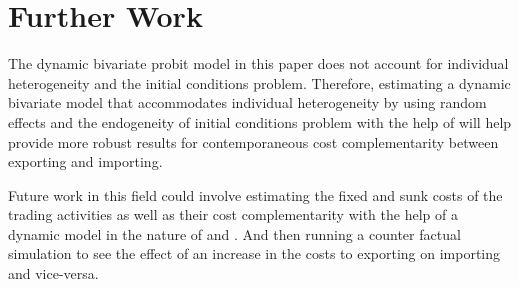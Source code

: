 \documentclass[12pt]{article}
\begin{document}
\section{Further Work}

The dynamic bivariate probit model in this paper does not account for
individual heterogeneity and the initial conditions
problem. Therefore, estimating a dynamic bivariate model that
accommodates individual heterogeneity by using random effects and the
endogeneity of initial conditions problem with the help of
\textcite{wooldridge2005simple} will help provide more robust
results for contemporaneous cost complementarity between exporting and
importing. 

Future work in this field could involve estimating the fixed and sunk
costs of the trading activities as well as their cost
complementarity with the help of a dynamic model in the nature of
\textcite{kasahara2013productivity} and \textcite{aw2011}. And then
running a counter factual simulation to see the effect of an increase in the
costs to exporting on importing and vice-versa.  
\end{document}
